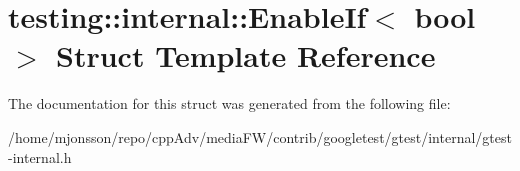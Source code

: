\hypertarget{structtesting_1_1internal_1_1EnableIf}{}\section{testing\+:\+:internal\+:\+:Enable\+If$<$ bool $>$ Struct Template Reference}
\label{structtesting_1_1internal_1_1EnableIf}


The documentation for this struct was generated from the following file\+:\begin{DoxyCompactItemize}
\item 
/home/mjonsson/repo/cpp\+Adv/media\+F\+W/contrib/googletest/gtest/internal/gtest-\/internal.\+h\end{DoxyCompactItemize}
